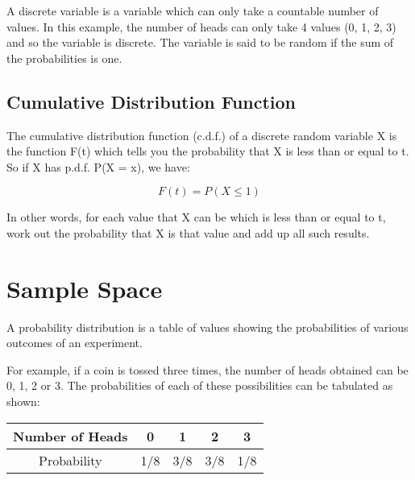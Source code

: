 \documentclass[]{report}
\begin{document}
{{{{{%

A discrete variable is a variable which can only take a countable number of values. In this example, the number of heads can only take 4 values (0, 1, 2, 3) and so the variable is discrete. The variable is said to be random if the sum of the probabilities is one. 











\subsection{Cumulative Distribution Function}

The cumulative distribution function (c.d.f.) of a discrete random variable X is the function F(t) which tells you the probability that X is less than or equal to t. So if X has p.d.f. P(X = x), we have:

\[F(t) = P(X \leq 1)\] %

In other words, for each value that X can be which is less than or equal to t, work out the probability that X is that value and add up all such results.

\section{Sample Space}


A probability distribution is a table of values showing the probabilities of various outcomes of an experiment.

For example, if a coin is tossed three times, the number of heads obtained can be 0, 1, 2 or 3. The probabilities of each of these possibilities can be tabulated as shown:

\begin{tabular}{|c|c|c|c|c|}
	\hline Number of Heads & 0 & 1 & 2 & 3 \\ 
	\hline Probability & 1/8  & 3/8  & 3/8 & 1/8 \\ 
	\hline 
\end{tabular} 









}}}}}
\end{document}
